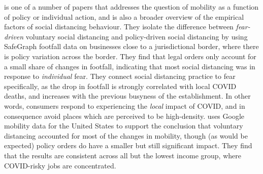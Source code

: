 \documentclass[12pt,a4]{article}
\begin{document}
\textcite{goolsbeeFearLockdownDiversion2021} is one of a number of papers that addresses the question of mobility as a function of policy or individual action, and is also a broader overview of the empirical factors of social distancing behaviour. They isolate the difference between \textit{fear-driven} voluntary social distancing and policy-driven social distancing by using SafeGraph footfall data on businesses close to a jurisdictional border, where there is policy variation across the border. They find that legal orders only account for a small share of changes in footfall, indicating that most social distancing was in response to \textit{individual} fear. They connect social distancing practice to fear specifically, as the drop in footfall is strongly correlated with local COVID deaths, and increases with the previous busyness of the establishment. In other words, consumers respond to experiencing the \textit{local} impact of COVID, and in consequence avoid places which are perceived to be high-density. \textcite{maloneyDeterminantsSocialDistancing2020} uses Google mobility data for the United States to support the conclusion that voluntary distancing accounted for most of the changes in mobility, though (as would be expected) policy orders do have a smaller but still significant impact. They find that the results are consistent across all but the lowest income group, where COVID-risky jobs are concentrated. 
\end{document}
